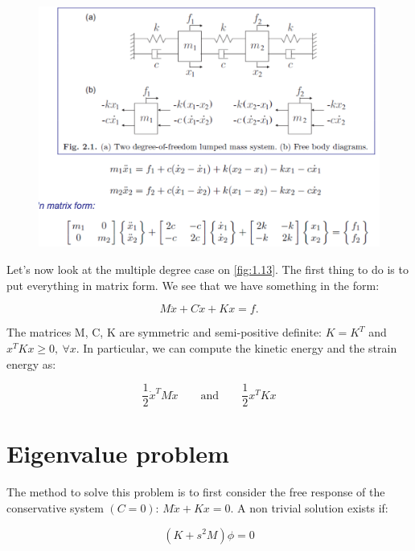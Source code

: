  			\begin{figure}
			\vspace{-5mm}
			\includegraphics[scale=0.3]{ch1/13}
			\label{fig:1.13}
			\end{figure}
			Let's now look at the multiple degree case on \autoref{fig:1.13}. The first thing to do is to put everything in matrix form. We see that we have something in the form:
			
			\begin{equation}
				M\ddot x + C \dot{x} + Kx = f.
\end{equation}			 

			The matrices M, C, K are symmetric and semi-positive definite: $K = K^T$ and $x^TKx\geq 0, \ \forall x$. In particular, we can compute the kinetic energy and the strain energy as:
			
			\begin{equation}
			\frac{1}{2}\dot{x}^TM\dot{x} \qquad \mbox{and} \qquad \frac{1}{2} {x}^TK{x}
			\end{equation}
			
		\section{Eigenvalue problem}
			The method to solve this problem is to first consider the free response of the conservative system $(C=0)$: $M\ddot{x} + Kx = 0$. A non trivial solution exists if: 
			
			\begin{equation}
				(K+s^2M)\phi = 0
			\end{equation}
			
